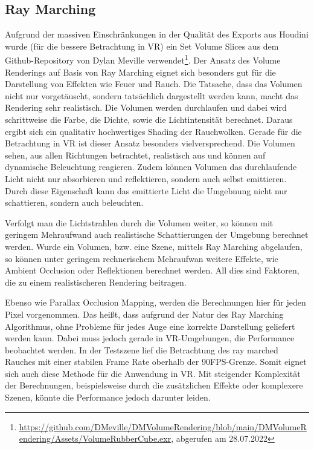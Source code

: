 \subsection{Ray Marching}
\label{sec:5.2}

Aufgrund der massiven Einschränkungen in der Qualität des Exports aus Houdini wurde (für die bessere Betrachtung in VR) ein Set Volume Slices aus dem 
Github-Repository von Dylan Meville verwendet\footnote{\url{https://github.com/DMeville/DMVolumeRendering/blob/main/DMVolumeRendering/Assets/VolumeRubberCube.exr}, abgerufen am 28.07.2022}.
Der Ansatz des Volume Renderings auf Basis von Ray Marching eignet sich besonders gut für die Darstellung von Effekten wie Feuer und Rauch. 
Die Tatsache, dass das Volumen nicht nur vorgetäuscht, sondern tatsächlich dargestellt werden kann, macht das Rendering sehr realistisch. 
Die Volumen werden durchlaufen und dabei wird schrittweise die Farbe, die Dichte, sowie die Lichtintensität berechnet. 
Daraus ergibt sich ein qualitativ hochwertiges Shading der Rauchwolken. Gerade für die Betrachtung in VR ist dieser Ansatz besonders vielversprechend. 
Die Volumen sehen, aus allen Richtungen betrachtet, realistisch aus und können auf dynamische Beleuchtung reagieren. 
Zudem können Volumen das durchlaufende Licht nicht nur absorbieren und reflektieren, sondern auch selbst emittieren. Durch diese Eigenschaft kann das
emittierte Licht die Umgebnung nicht nur schattieren, sondern auch beleuchten. 

Verfolgt man die Lichtstrahlen durch die Volumen weiter, so können mit geringem Mehraufwand auch realistische Schattierungen der Umgebung berechnet werden. 
Wurde ein Volumen, bzw. eine Szene, mittels Ray Marching abgelaufen, so können unter geringem rechnerischem Mehraufwan weitere Effekte, wie 
Ambient Occlusion oder Reflektionen berechnet werden. All dies sind Faktoren, die zu einem realistischeren Rendering beitragen.

Ebenso wie Parallax Occlusion Mapping, werden die Berechnungen hier für jeden Pixel vorgenommen.
Das heißt, dass aufgrund der Natur des Ray Marching Algorithmus, ohne Probleme für jedes Auge eine korrekte Darstellung geliefert werden kann. 
Dabei muss jedoch gerade in VR-Umgebungen, die Performance beobachtet werden. 
In der Testszene lief die Betrachtung des ray marched Rauches mit einer stabilen Frame Rate oberhalb der 90FPS-Grenze. 
Somit eignet sich auch diese Methode für die Anwendung in VR. Mit steigender Komplexität der Berechnungen, beispielsweise durch die zusätzlichen Effekte
oder komplexere Szenen, könnte die Performance jedoch darunter leiden. 

